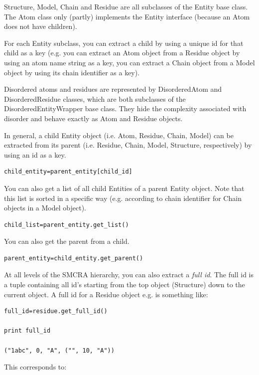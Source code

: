 \documentclass{report}
\begin{document}
Structure, Model, Chain and Residue are all subclasses of the Entity base class.
The Atom class only (partly) implements the Entity interface (because an Atom
does not have children).

For each Entity subclass, you can extract a child by using a unique id for that
child as a key (e.g. you can extract an Atom object from a Residue object by
using an atom name string as a key, you can extract a Chain object from a Model
object by using its chain identifier as a key).

Disordered atoms and residues are represented by DisorderedAtom and DisorderedResidue
classes, which are both subclasses of the DisorderedEntityWrapper base class.
They hide the complexity associated with disorder and behave exactly as Atom
and Residue objects.

In general, a child Entity object (i.e. Atom, Residue, Chain, Model) can be
extracted from its parent (i.e. Residue, Chain, Model, Structure, respectively)
by using an id as a key.

\begin{verbatim}
child_entity=parent_entity[child_id]
\end{verbatim}

You can also get a list of all child Entities of a parent Entity object. Note
that this list is sorted in a specific way (e.g. according to chain identifier
for Chain objects in a Model object).

\begin{verbatim}
child_list=parent_entity.get_list()
\end{verbatim}

You can also get the parent from a child.

\begin{verbatim}
parent_entity=child_entity.get_parent()
\end{verbatim}

At all levels of the SMCRA hierarchy, you can also extract a \emph{full id}.
The full id is a tuple containing all id's starting from the top object (Structure)
down to the current object. A full id for a Residue object e.g. is something
like:

\begin{verbatim}
full_id=residue.get_full_id()

print full_id

("1abc", 0, "A", ("", 10, "A"))
\end{verbatim}

This corresponds to:
\end{document}
